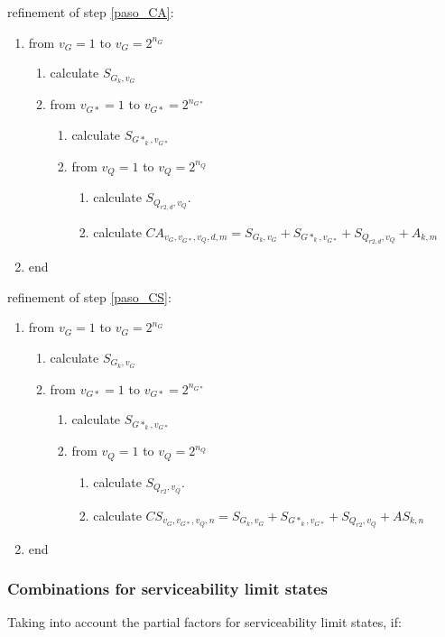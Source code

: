 \noindent refinement of step \ref{paso_CA}:
\begin{enumerate}
\item from $v_G=1$ to $v_G=2^{n_G}$
\begin{enumerate}
\item calculate $S_{G_k,v_G}$
\item from $v_{G*}=1$ to $v_{G*}=2^{n_{G*}}$
\begin{enumerate}
\item calculate $S_{G*_k,v_{G*}}$
\item from $v_Q=1$ to $v_Q=2^{n_Q}$
\begin{enumerate}
\item calculate $S_{Q_{r2,d},v_Q}$.
\item calculate $CA_{v_G,v_{G*},v_Q,d,m}= S_{G_k,v_G}+S_{G*_k,v_{G*}}+S_{Q_{r2,d},v_Q}+A_{k,m}$
\end{enumerate}
\end{enumerate}
\end{enumerate}
\item end
\end{enumerate}

\noindent refinement of step \ref{paso_CS}:
\begin{enumerate}
\item from $v_G=1$ to $v_G=2^{n_G}$
\begin{enumerate}
\item calculate $S_{G_k,v_G}$
\item from $v_{G*}=1$ to $v_{G*}=2^{n_{G*}}$
\begin{enumerate}
\item calculate $S_{G*_k,v_{G*}}$
\item from $v_Q=1$ to $v_Q=2^{n_Q}$
\begin{enumerate}
\item calculate $S_{Q_{r2},v_Q}$.
\item calculate $CS_{v_G,v_{G*},v_Q,n}= S_{G_k,v_G}+S_{G*_k,v_{G*}}+S_{Q_{r2},v_Q}+AS_{k,n}$
\end{enumerate}
\end{enumerate}
\end{enumerate}
\item end
\end{enumerate}

\subsubsection{Combinations for serviceability limit states}
Taking into account the partial factors for serviceability limit states, if:


